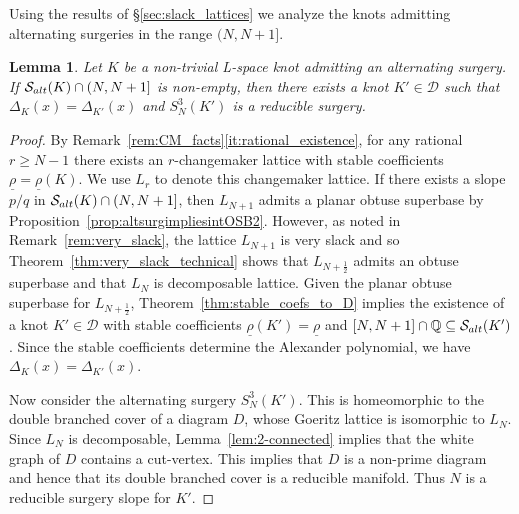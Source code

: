 \documentclass{amsart} %
\newcommand{\D}{\mathcal{D}}
\newcommand{\Q}{\mathbb{Q}}
\newcommand{\Salt}{\mathcal{S}_{\rm alt}}
\theoremstyle{thm}
\newtheorem{lem}[Theorem]{Lemma}
\theoremstyle{definition}
\numberwithin{equation}{section}
\begin{document}
Using the results of \S\ref{sec:slack_lattices} we analyze the knots admitting alternating surgeries in the range $(N, N+1]$.

\begin{lem}\label{lem:pq>N_alt_surgery}
    Let $K$ be a non-trivial L-space knot admitting an alternating surgery. If $\Salt(K)\cap (N, N+1]$ is non-empty, then there exists a knot $K'\in\D$ such that $\Delta_K(x)=\Delta_{K'}(x)$ and $S_N^3(K')$ is a reducible surgery.
\end{lem}
\begin{proof}
By Remark~\ref{rem:CM_facts}\eqref{it:rational_existence}, for any rational $r\geq N-1$ there exists an $r$-changemaker lattice with stable coefficients $\underline{\rho}=\underline{\rho}(K)$. We use $L_r$ to denote this changemaker lattice. 
If there exists a slope $p/q$ in $\Salt(K)\cap (N, N+1]$, then $L_{N+1}$ admits a planar obtuse superbase by Proposition~\ref{prop:altsurgimpliesintOSB2}. However, as noted in Remark~\ref{rem:very_slack}, the lattice $L_{N+1}$ is very slack and so Theorem~\ref{thm:very_slack_technical} shows that $L_{N+\frac12}$ admits an obtuse superbase and that $L_N$ is decomposable lattice. Given the planar obtuse superbase for $L_{N+\frac12}$, Theorem~\ref{thm:stable_coefs_to_D} implies the existence of a knot $K'\in \D$ with stable coefficients $\underline{\rho}(K')=\underline{\rho}$ and $[N,N+1]\cap \Q \subseteq \Salt(K')$. Since the stable coefficients determine the Alexander polynomial, we have $\Delta_K(x)=\Delta_{K'}(x)$.

Now consider the alternating surgery $S_N^3(K')$. This is homeomorphic to the double branched cover of a diagram $D$, whose Goeritz lattice is isomorphic to $L_N$. Since $L_N$ is decomposable, Lemma~\ref{lem:2-connected} implies that the white graph of $D$ contains a cut-vertex. This implies that $D$ is a non-prime diagram and hence that its double branched cover is a reducible manifold. Thus $N$ is a reducible surgery slope for $K'$.
\end{proof}
\end{document}
